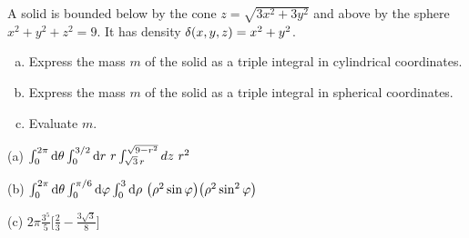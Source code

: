\begin{question}[M200 2004A] %
A solid is bounded below by the cone $z=\sqrt{3x^2+3y^2}$
and above by the sphere $x^2+y^2+z^2=9$. It has density $\delta(x,y,z)=x^2+y^2$.
\begin{enumerate}[(a)]
\item
Express the mass $m$ of the solid as a triple integral in
cylindrical coordinates.
\item
Express the mass $m$ of the solid as a triple integral in
spherical coordinates.
\item 
Evaluate $m$.
\end{enumerate}
\end{question}

%

\begin{answer}
(a) $\int_0^{2\pi}\dee{\theta}\int_0^{3/2}\dee{r}\ r\int_{\sqrt{3}\,r}^{\sqrt{9-r^2}}dz\ r^2$

(b) $\int_0^{2\pi}\dee{\theta}\int_0^{\pi/6}\dee{\varphi}\int_0^3\dee{\rho}\ \big(\rho^2\sin\varphi\big)
\big(\rho^2\sin^2\varphi\big)$

(c) $2\pi \frac{3^5}{5} \big[\frac{2}{3}-\frac{3\sqrt{3}}{8}\big]$
\end{answer}

